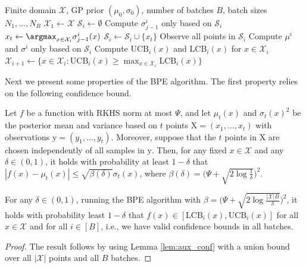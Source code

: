 \documentclass[10pt]{article}
\begin{document}
\begin{algorithm}[!h]
\caption{Batched Pure Exploration (BPE) for finite domain \label{algo:bpe}}
\begin{algorithmic}[1]
    \REQUIRE Finite domain $\mathcal{X}$, GP prior $(\mu_0, \sigma_0)$, number of batches $B$, batch sizes $N_1, ..., N_B$
    \STATE $\mathcal{X}_1 \gets \mathcal{X}$
        \STATE $\mathcal{S}_i\gets\emptyset$
            \STATE Compute $\sigma^i_{j-1}$ only based on $\mathcal{S}_i$
            \STATE $x_t \gets \argmax_{x\in \mathcal{X}_{i}} \sigma^i_{j-1}(x)$
            \STATE $\mathcal{S}_i\gets \mathcal{S}_i\cup\{x_t\}$
        \ENDFOR
        \STATE Observe all points in $\mathcal{S}_i$
        \STATE Compute $\mu^{i}$ and $\sigma^{i}$ only based on $\mathcal{S}_i$
        \STATE Compute $\mathrm{UCB}_i(x)$ and $\mathrm{LCB}_i(x)$ for $x\in\mathcal{X}_i$
        \STATE $\mathcal{X}_{i+1} \gets \{ x \in \mathcal{X}_{i}: \mathrm{UCB}_i(x) \geq \max_{x\in\mathcal{X}_i} \mathrm{LCB}_i(x) \}$
    \ENDFOR   
\end{algorithmic}
\end{algorithm}

Next we present some properties of the BPE algorithm. The first property relies on the following confidence bound.
\begin{lemma} 
    \emph{\citep[Theorem 1]{Vakili21a}}
    \label{lem:aux_conf}
    Let $f$ be a function with RKHS norm at most $\Psi$, and let ${\mu}_t(x)$ and ${\sigma}_t(x)^2$ be the posterior mean and variance based on $t$ points $\mathrm{X} = (x_1,\dotsc,x_t)$ with observations $\mathrm{y} = (y_1,\dotsc,y_t)$.  Moreover, suppose that the $t$ points in $\mathrm{X}$ are chosen independently of all samples in $\mathrm{y}$.  Then, for any fixed $x\in \mathcal{X}$ and any $\delta \in (0,1)$, it holds with probability at least $1-\delta$ that $|f(x)-\mu_t(x)|\leq\sqrt{\beta(\delta)}\sigma_t(x)$, where $\beta(\delta) = \bigl(\Psi + \sqrt{2 \log \frac{1}{\delta}}\bigr)^2$.
\end{lemma}


\begin{proposition}
    \label{prop:bpe_confidence_bounds}
    For any $\delta \in (0,1)$, running the BPE algorithm with $\beta = \bigl( \Psi + \sqrt{2 \log \frac{|\mathcal{X}| B}{\delta}} \bigr)^2$, it holds with probability least $1-\delta$ that $f(x)\in[\mathrm{LCB}_i(x),\mathrm{UCB}_i(x)]$ for all $x\in\mathcal{X}$ and for all $i\in[B]$, i.e., we have valid confidence bounds in all batches.
\end{proposition}
\begin{proof}
    The result follows by using Lemma \ref{lem:aux_conf} with a union bound over all $\lvert \mathcal{X}\rvert$ points and all $B$ batches. 
\end{proof}
\end{document}
